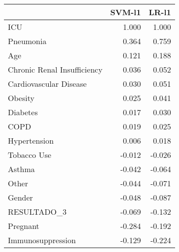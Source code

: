 \begin{tabular}{lrr}
\toprule
{} &  SVM-l1 &  LR-l1 \\
\midrule
ICU                         &   1.000 &  1.000 \\
Pneumonia                   &   0.364 &  0.759 \\
Age                         &   0.121 &  0.188 \\
Chronic Renal Insufficiency &   0.036 &  0.052 \\
Cardiovascular Disease      &   0.030 &  0.051 \\
Obesity                     &   0.025 &  0.041 \\
Diabetes                    &   0.017 &  0.030 \\
COPD                        &   0.019 &  0.025 \\
Hypertension                &   0.006 &  0.018 \\
Tobacco Use                 &  -0.012 & -0.026 \\
Asthma                      &  -0.042 & -0.064 \\
Other                       &  -0.044 & -0.071 \\
Gender                      &  -0.048 & -0.087 \\
RESULTADO\_3                 &  -0.069 & -0.132 \\
Pregnant                    &  -0.284 & -0.192 \\
Immunosuppression           &  -0.129 & -0.224 \\
\bottomrule
\end{tabular}
